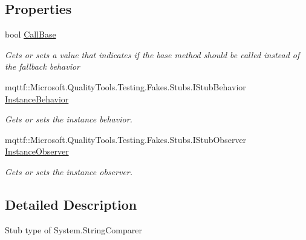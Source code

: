 \subsection*{Properties}
\begin{DoxyCompactItemize}
\item 
bool \hyperlink{class_system_1_1_fakes_1_1_stub_string_comparer_adc4b05118ad0e46fedb34697683a112a}{Call\-Base}
\begin{DoxyCompactList}\small\item\em Gets or sets a value that indicates if the base method should be called instead of the fallback behavior\end{DoxyCompactList}\item 
mqttf\-::\-Microsoft.\-Quality\-Tools.\-Testing.\-Fakes.\-Stubs.\-I\-Stub\-Behavior \hyperlink{class_system_1_1_fakes_1_1_stub_string_comparer_ad3f62cb99fad6051bf3dc7a5a5744ced}{Instance\-Behavior}
\begin{DoxyCompactList}\small\item\em Gets or sets the instance behavior.\end{DoxyCompactList}\item 
mqttf\-::\-Microsoft.\-Quality\-Tools.\-Testing.\-Fakes.\-Stubs.\-I\-Stub\-Observer \hyperlink{class_system_1_1_fakes_1_1_stub_string_comparer_a06d09dd25a55687d1be4ca9e297f9f3d}{Instance\-Observer}
\begin{DoxyCompactList}\small\item\em Gets or sets the instance observer.\end{DoxyCompactList}\end{DoxyCompactItemize}


\subsection{Detailed Description}
Stub type of System.\-String\-Comparer



